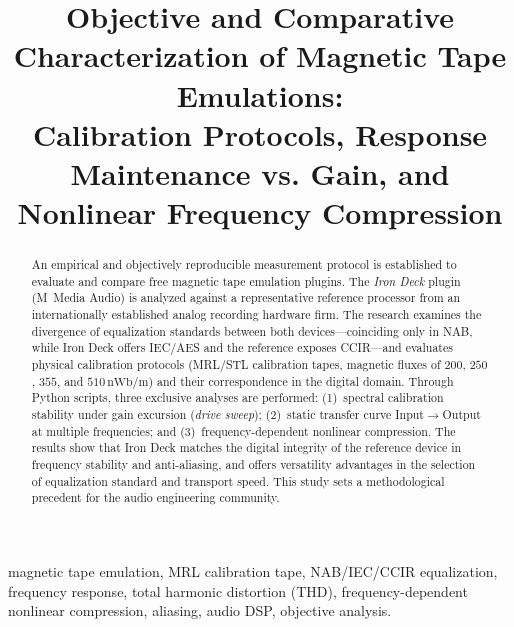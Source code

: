 \documentclass[10pt,conference]{IEEEtran}
\begin{document}
\title{Objective and Comparative Characterization of Magnetic Tape Emulations: \\
Calibration Protocols, Response Maintenance vs. Gain, and Nonlinear Frequency Compression}

\author{
}

\maketitle

\begin{abstract}
An empirical and objectively reproducible measurement protocol is established to evaluate and
compare free magnetic tape emulation plugins. The \emph{Iron Deck} plugin (M~Media Audio)
is analyzed against a representative reference processor from an internationally established
analog recording hardware firm.
The research examines the divergence of equalization standards between both devices—coinciding
only in NAB, while Iron Deck offers IEC/AES and the reference exposes CCIR—and evaluates physical
calibration protocols (MRL/STL calibration tapes, magnetic fluxes of $200$, $250$, $355$, and
$510\,\text{nWb/m}$) and their correspondence in the digital domain.
Through Python scripts, three exclusive analyses are performed: (1)~spectral calibration
stability under gain excursion (\emph{drive sweep}); (2)~static transfer curve
Input$\to$Output at multiple frequencies; and (3)~frequency-dependent nonlinear compression.
The results show that Iron Deck matches the digital integrity of the reference device
in frequency stability and anti-aliasing, and offers versatility advantages in the selection
of equalization standard and transport speed.
This study sets a methodological precedent for the audio engineering community.
\end{abstract}

\begin{IEEEkeywords}
magnetic tape emulation, MRL calibration tape, NAB/IEC/CCIR equalization, frequency response,
total harmonic distortion (THD), frequency-dependent nonlinear compression, aliasing,
audio DSP, objective analysis.
\end{IEEEkeywords}

\end{document}
